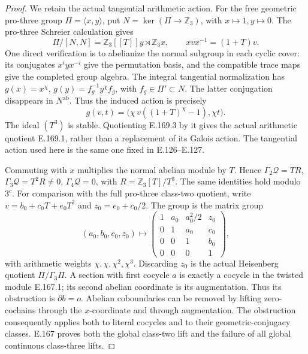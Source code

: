 \begin{proof}
We retain the actual tangential arithmetic action.  For the free
geometric pro-three group \(\Pi=\langle x,y\rangle\), put
\(N=\ker(\Pi\to\mathbb Z_3)\), with \(x\mapsto1,y\mapsto0\).
The pro-three Schreier calculation gives
\[
 \Pi/[N,N]=\mathbb Z_3[[T]]y\rtimes\mathbb Z_3x,
                         \qquad xvx^{-1}=(1+T)v.
\tag{E.169.3}
\]
One direct verification is to abelianize the normal subgroup in
each cyclic cover: its conjugates \(x^i yx^{-i}\) give the
permutation basis, and the compatible trace maps give the
completed group algebra.  The integral tangential normalization
has \(g(x)=x^\chi\), \(g(y)=f_g^{-1}y^\chi f_g\), with
\(f_g\in\Pi'\subset N\).  The latter conjugation disappears
in \(N^{\mathrm{ab}}\).  Thus the induced action is precisely
\[
 g(v,t)=\bigl(\chi\,v((1+T)^\chi-1),\chi t\bigr).
\tag{E.169.4}
\]
The ideal \((T^3)\) is stable.  Quotienting E.169.3 by it gives
the actual arithmetic quotient E.169.1, rather than a replacement
of its Galois action.  The tangential action used here is the
same one fixed in E.126--E.127.

Commuting with \(x\) multiplies the normal abelian module by
\(T\).  Hence
\(\Gamma_2\mathcal Q=TR\), \(\Gamma_3\mathcal Q=T^2R\ne0\),
\(\Gamma_4\mathcal Q=0\), with \(R=\mathbb Z_3[T]/T^3\).
The same identities hold modulo \(3^c\).
For comparison with the full pro-three class-two quotient, write
\(v=b_0+c_0T+e_0T^2\) and \(z_0=e_0+c_0/2\).
The group is the matrix group
\[
 (a_0,b_0,c_0,z_0)\longmapsto
 \begin{pmatrix}
 1&a_0&a_0^2/2&z_0\\
 0&1&a_0&c_0\\
 0&0&1&b_0\\
 0&0&0&1
 \end{pmatrix},
\tag{E.169.5}
\]
with arithmetic weights \(\chi,\chi,\chi^2,\chi^3\).
Discarding \(z_0\) is the actual Heisenberg quotient
\(\Pi/\Gamma_3\Pi\).  A section with first cocycle \(a\)
is exactly a cocycle in the twisted module E.167.1; its second
abelian coordinate is its augmentation.  Thus its obstruction
is \(\partial b=o\).  Abelian coboundaries can be removed by
lifting zero-cochains through the \(x\)-coordinate and through
augmentation.  The obstruction consequently applies both to
literal cocycles and to their geometric-conjugacy classes.
E.167 proves both the global class-two lift and the failure of
all global continuous class-three lifts.


\end{proof}
